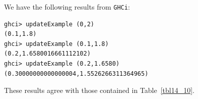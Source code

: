 We have the following results from \verb|GHCi|:

\begin{lstlisting}
ghci> updateExample (0,2)
(0.1,1.8)
ghci> updateExample (0.1,1.8)
(0.2,1.6580016661112102)
ghci> updateExample (0.2,1.6580)
(0.30000000000000004,1.5526266311364965)
\end{lstlisting}

These results agree with those contained in Table~\ref{tbl14_10}. 
